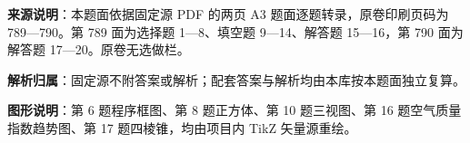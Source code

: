 

\begin{gknotice}
\textbf{来源说明}：本题面依据固定源 PDF 的两页 A3 题面逐题转录，原卷印刷页码为 789—790。第 789 面为选择题 1—8、填空题 9—14、解答题 15—16，第 790 面为解答题 17—20。原卷无选做栏。

\textbf{解析归属}：固定源不附答案或解析；配套答案与解析均由本库按本题面独立复算。

\textbf{图形说明}：第 6 题程序框图、第 8 题正方体、第 10 题三视图、第 16 题空气质量指数趋势图、第 17 题四棱锥，均由项目内 TikZ 矢量源重绘。
\end{gknotice}


